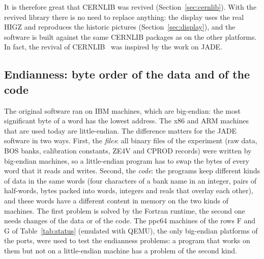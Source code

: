 It is therefore great that CERNLIB was revived (Section~\ref{sec:cernlib}). With the revived library there is no need to replace
anything: the display uses the real HIGZ and reproduces the historic pictures (Section~\ref{sec:display}), and the software is
built against the same CERNLIB packages as on the other platforms. In fact, the revival of CERNLIB~\cite{Schwickerath:2023cernlib} was inspired by the work on JADE.

\subsection{Endianness: byte order of the data and of the code}
\label{sec:endian}
The original software ran on IBM machines, which are big-endian: the most significant byte of a word has the lowest address. The x86 and ARM machines that
are used today are little-endian. The difference matters for the JADE software in two ways. First, the \emph{files}: all binary files of the experiment
(raw data, BOS banks, calibration constants, ZE4V and CPROD records) were written by big-endian machines, so a little-endian program has to swap
the bytes of every word that it reads and writes. Second, the \emph{code}: the programs keep different kinds of data in the same words (four characters of a bank name in an integer,
pairs of half-words, bytes packed into words, integers and reals that overlay each other), and these words have a different content in memory on the two kinds of machines.
The first problem is solved by the Fortran runtime, the second one needs changes of the data or of the code. The ppc64 machines of the rows F and G of
Table~\ref{tab:status} (emulated with QEMU), the only big-endian platforms of the ports, were used to test the endianness problems: a program that works on them but not on
a little-endian machine has a problem of the second kind.

